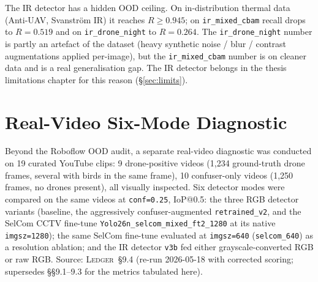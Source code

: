 \documentclass[12pt,a4paper,oneside,openright]{book}
\begin{document}
The IR detector has a hidden OOD ceiling. On in-distribution thermal data (Anti-UAV, Svanstr\"om IR) it reaches $R \geq 0.945$; on \texttt{ir\_mixed\_cbam} recall drops to $R=0.519$ and on \texttt{ir\_drone\_night} to $R=0.264$. The \texttt{ir\_drone\_night} number is partly an artefact of the dataset (heavy synthetic noise / blur / contrast augmentations applied per-image), but the \texttt{ir\_mixed\_cbam} number is on cleaner data and is a real generalisation gap. The IR detector belongs in the thesis limitations chapter for this reason (\S\ref{sec:limits}).

\section{Real-Video Six-Mode Diagnostic}
\label{sec:realvideo}

Beyond the Roboflow OOD audit, a separate real-video diagnostic was conducted on 19 curated YouTube clips: 9 drone-positive videos (1{,}234 ground-truth drone frames, several with birds in the same frame), 10 confuser-only videos (1{,}250 frames, no drones present), all visually inspected. Six detector modes were compared on the same videos at \texttt{conf=0.25}, IoP@0.5: the three RGB detector variants (baseline, the aggressively confuser-augmented \texttt{retrained\_v2}, and the SelCom CCTV fine-tune \texttt{Yolo26n\_selcom\_mixed\_ft2\_1280} at its native \texttt{imgsz=1280}); the same SelCom fine-tune evaluated at \texttt{imgsz=640} (\texttt{selcom\_640}) as a resolution ablation; and the IR detector \texttt{v3b} fed either grayscale-converted RGB or raw RGB. Source: \textsc{Ledger}~\S9.4 (re-run 2026-05-18 with corrected scoring; supersedes \S\S9.1--9.3 for the metrics tabulated here).
\end{document}
